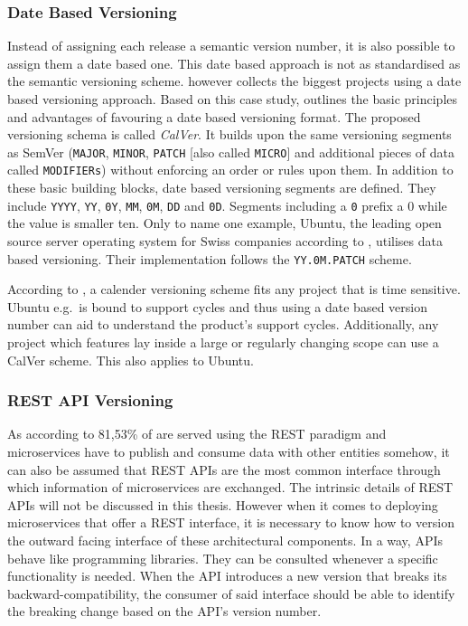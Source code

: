 \subsubsection{Date Based Versioning}%
\label{ssub:Date_Based_Versioning}
Instead of assigning each release a semantic version number, it is also
possible to assign them a date based one. This date based approach is not as
standardised as the semantic versioning scheme.
\autocite{HashemiCalendarVersioning2017} however collects the biggest projects
using a date based versioning approach. Based on this case study,
\autocite{HashemiCalendarVersioning2017} outlines the basic principles and
advantages of favouring a date based versioning format. The proposed versioning
schema is called \textit{CalVer}. It builds upon the same versioning segments
as SemVer (\texttt{MAJOR}, \texttt{MINOR}, \texttt{PATCH} [also called
\texttt{MICRO}] and additional pieces of data called \texttt{MODIFIERs})
without enforcing an order or rules upon them. In addition to these basic
building blocks, date based versioning segments are defined. They include
\texttt{YYYY}, \texttt{YY}, \texttt{0Y}, \texttt{MM}, \texttt{0M}, \texttt{DD}
and \texttt{0D}. Segments including a \texttt{0} prefix a 0 while the value is
smaller ten. Only to name one example, Ubuntu, the leading open source server
operating system for Swiss companies according to
\autocite{SwissICTWelcheOpenSource2018}, utilises data based versioning. Their
implementation follows the \texttt{YY.0M.PATCH} scheme.

According to \autocite{HashemiCalendarVersioning2017}, a calender versioning
scheme fits any project that is time sensitive. Ubuntu e.g.\ is bound to
support cycles and thus using a date based version number can aid to understand
the product's support cycles. Additionally, any project which features lay
inside a large or regularly changing scope can use a CalVer scheme. This also
applies to Ubuntu.

\subsubsection{REST API Versioning}%
\label{ssub:API_Versioning}
As according to \autocite{SantosWhichAPITypes2017} 81,53\% of  are
served using the \ac{REST} paradigm and microservices have to publish and
consume data with other entities somehow, it can also be assumed that \ac{REST}
\acp{API} are the most common interface through which information of
microservices are exchanged. The intrinsic details of \ac{REST} \acp{API} will
not be discussed in this thesis. However when it comes to deploying
microservices that offer a \ac{REST} interface, it is necessary to know how to
version the outward facing interface of these architectural components. In a
way, \acp{API} behave like programming libraries. They can be consulted
whenever a specific functionality is needed. When the \ac{API} introduces a new
version that breaks its backward-compatibility, the consumer of said interface
should be able to identify the breaking change based on the \ac{API}'s version
number.

